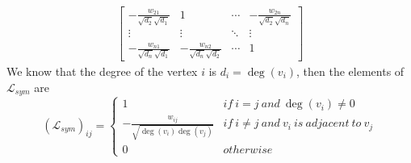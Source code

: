 \documentclass[oneside]{book}
\begin{document}
{{\begin{align}
\begin{bmatrix}
                    -\frac{w_{21}}{\sqrt{d_{2}}\sqrt{d_{1}}} & 1                                        & \cdots & -\frac{w_{2n}}{\sqrt{d_{2}}\sqrt{d_{n}}}\\
                    \vdots                                   & \vdots                                   & \ddots & \vdots\\
                    -\frac{w_{n1}}{\sqrt{d_{n}}\sqrt{d_{1}}} & -\frac{w_{n2}}{\sqrt{d_{n}}\sqrt{d_{2}}} & \cdots & 1
                \end{bmatrix}
        \end{align}
        We know that the degree of the vertex $i$ is $d_{i}=\deg(v_{i})$, then the elements of $\mathcal{L}_{sym}$ are
        \[
            (\mathcal{L}_{sym})_{ij}=
                \left\{
                    \begin{array}{ll}
                        1                                        & if\ i=j\ and\ \deg(v_{i}) \neq 0\\
                        -\frac{w_{ij}}{\sqrt{\deg(v_{i})\deg(v_{j})}} & if\ i \neq j\ and\ v_{i}\ is\ adjacent\ to\ v_{j}\\
                        0                                        & otherwise
                    \end{array}
                \right.
        \]
    }

}
\end{document}
